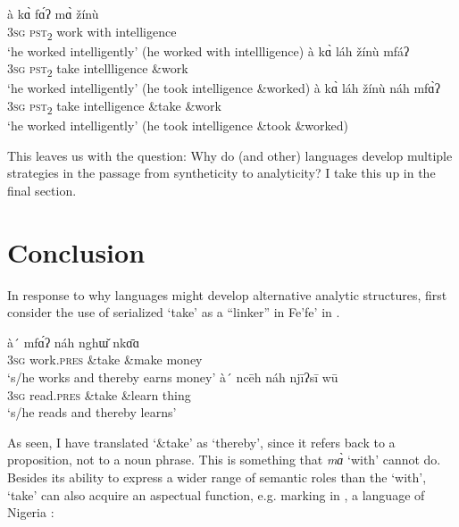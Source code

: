 \documentclass[output=paper]{langsci/langscibook}
\begin{document}
\ea
\label{ex:hyman:31}
\ea 
\gll à    k\`ɑ   f\'ɑʔ     m\`ɑ     žínù  \\
\textsc{3sg} \textsc{pst}\textsubscript{2} work   with intelligence \\
\glt ‘he worked intelligently’ (he worked with intellligence)
\ex 
\gll à    k\`ɑ   láh      žínù       mfáʔ \\
\textsc{3sg} \textsc{pst}\textsubscript{2} take intellligence \&work \\
\glt ‘he worked intelligently’ (he took intelligence \&worked)
\ex 
\gll à    k\`ɑ   láh      žínù       náh   mf\`ɑʔ  \\
\textsc{3sg} \textsc{pst}\textsubscript{2} take intelligence \&take \&work\\ 
\glt ‘he worked intelligently’ (he took intelligence \&took \&worked)
\z 
\z 

This leaves us with the question: Why do  (and other) languages develop multiple strategies in the passage from syntheticity to analyticity? I take this up in the final section.

\section{Conclusion}\label{sec:hyman:3}

In response to why languages might develop alternative analytic structures, first consider the use of serialized ‘take’ as a “linker” in Fe’fe’ in .

\ea
\label{ex:hyman:32}
\ea 
\gll à´    mf\'ɑʔ      náh   ngh\v{ɯ}  nk\=ɑɑ \\
\textsc{3sg} work.\textsc{pres} \&take \&make money\\
\glt ‘s/he works and thereby earns money’
\ex 
\gll à´    ncēh      náh   nj\={i}ʔs\={i}  wū \\
\textsc{3sg}  read.\textsc{pres} \&take  \&learn thing \\
\glt ‘s/he reads and thereby learns’
\z 
\z 

\noindent
As seen, I have translated ‘\&take’ as ‘thereby’, since it refers back to a proposition, not to a noun phrase. This is something that \textit{m\`ɑ} ‘with’ cannot do. Besides its ability to express a wider range of semantic roles than the  ‘with’, ‘take’ can also acquire an aspectual function, e.g. marking  in , a  language of Nigeria \citep{Hyman1970}:
\end{document}
